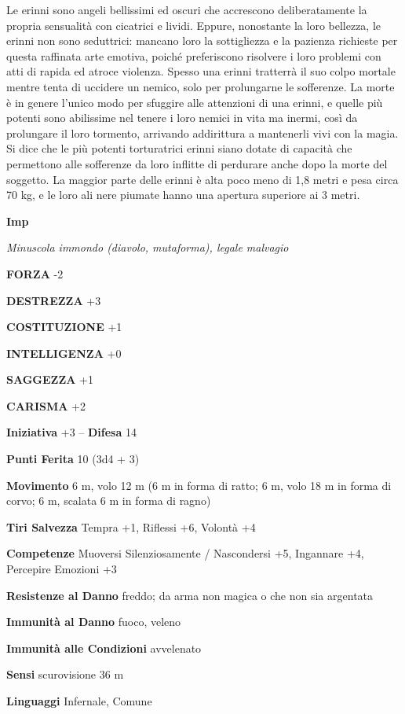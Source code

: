 \begin{multicols}{2}
Le erinni sono angeli bellissimi ed oscuri che accrescono deliberatamente la propria sensualità con cicatrici e lividi. Eppure, nonostante la loro bellezza, le erinni non sono seduttrici: mancano loro la sottigliezza e la pazienza richieste per questa raffinata arte emotiva, poiché preferiscono risolvere i loro problemi con atti di rapida ed atroce violenza. Spesso una erinni tratterrà il suo colpo mortale mentre tenta di uccidere un nemico, solo per prolungarne le sofferenze. La morte è in genere l'unico modo per sfuggire alle attenzioni di una erinni, e quelle più potenti sono abilissime nel tenere i loro nemici in vita ma inermi, così da prolungare il loro tormento, arrivando addirittura a mantenerli vivi con la magia. Si dice che le più potenti torturatrici erinni siano dotate di capacità che permettono alle sofferenze da loro inflitte di perdurare anche dopo la morte del soggetto.  La maggior parte delle erinni è alta poco meno di 1,8 metri e pesa circa 70 kg, e le loro ali nere piumate hanno una apertura superiore ai 3 metri.


\medskip{}\textbf{Imp}

\textit{Minuscola immondo (diavolo, mutaforma), legale malvagio}

\textbf{FORZA} -2

\textbf{DESTREZZA} +3

\textbf{COSTITUZIONE} +1

\textbf{INTELLIGENZA} +0

\textbf{SAGGEZZA} +1

\textbf{CARISMA} +2

\textbf{Iniziativa} +3 -- \textbf{Difesa} 14

\textbf{Punti Ferita} 10 (3d4 + 3)

\textbf{Movimento} 6 m, volo 12 m (6 m in forma di ratto; 6 m, volo 18 m in forma di corvo; 6 m, scalata 6 m in forma di ragno)

\textbf{Tiri Salvezza} Tempra +1, Riflessi +6, Volontà +4

\textbf{Competenze} Muoversi Silenziosamente / Nascondersi +5, Ingannare +4, Percepire Emozioni +3

\textbf{Resistenze al Danno} freddo; da arma non magica o che non sia argentata

\textbf{Immunità al Danno} fuoco, veleno

\textbf{Immunità alle Condizioni} avvelenato

\textbf{Sensi} scurovisione 36 m

\textbf{Linguaggi} Infernale, Comune


\end{multicols}
